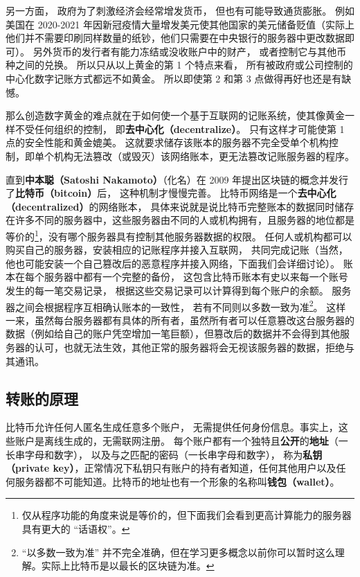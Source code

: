 另一方面， 政府为了刺激经济会经常增发货币， 但也有可能导致通货膨胀。 例如美国在 2020-2021 年因新冠疫情大量增发美元使其他国家的美元储备贬值（实际上他们并不需要印刷同样数量的纸钞，他们只需要在中央银行的服务器中更改数据即可）。 另外货币的发行者有能力冻结或没收账户中的财产， 或者控制它与其他币种之间的兑换。 所以只从以上黄金的第 1 个特点来看， 所有被政府或公司控制的中心化数字记账方式都远不如黄金。 所以即使第 2 和第 3 点做得再好也还是有缺憾。

那么创造数字黄金的难点就在于如何使一个基于互联网的记账系统，使其像黄金一样不受任何组织的控制， 即\textbf{去中心化（decentralize）}。 只有这样才可能使第 1 点的安全性能和黄金媲美。 这就要求储存该账本的服务器不完全受单个机构控制，即单个机构无法篡改（或毁灭）该网络账本，更无法篡改记账服务器的程序。

直到\textbf{中本聪（Satoshi Nakamoto）}（化名）在 2009 年提出区块链的概念并发行了\textbf{比特币（bitcoin）}后， 这种机制才慢慢完善。 比特币网络是一个\textbf{去中心化（decentralized）}的网络账本， 具体来说就是说比特币完整账本的数据同时储存在许多不同的服务器中，这些服务器由不同的人或机构拥有，且服务器的地位都是等价的\footnote{仅从程序功能的角度来说是等价的，但下面我们会看到更高计算能力的服务器具有更大的 “话语权”。}，没有哪个服务器具有控制其他服务器数据的权限。 任何人或机构都可以购买自己的服务器，安装相应的记账程序并接入互联网， 共同完成记账（当然，他也可能安装一个自己篡改后的恶意程序并接入网络，下面我们会详细讨论）。 账本在每个服务器中都有一个完整的备份， 这包含比特币账本有史以来每一个账号发生的每一笔交易记录， 根据这些交易记录可以计算得到每个账户的余额。 服务器之间会根据程序互相确认账本的一致性， 若有不同则以多数一致为准\footnote{“以多数一致为准” 并不完全准确，但在学习更多概念以前你可以暂时这么理解。实际上比特币是以最长的区块链为准。}。 这样一来，虽然每台服务器都有具体的所有者，虽然所有者可以任意篡改这台服务器的数据（例如给自己的账户凭空增加一笔巨额），但篡改后的数据并不会得到其他服务器的认可，也就无法生效，其他正常的服务器将会无视该服务器的数据，拒绝与其通讯。

\subsection{转账的原理}
比特币允许任何人匿名生成任意多个账户， 无需提供任何身份信息。事实上，这些账户是离线生成的，无需联网注册。 每个账户都有一个独特且\textbf{公开}的\textbf{地址}（一长串字母和数字）， 以及与之匹配的密码（一长串字母和数字）， 称为\textbf{私钥（private key）}，正常情况下私钥只有账户的持有者知道，任何其他用户以及任何服务器都不可能知道。比特币的地址也有一个形象的名称叫\textbf{钱包（wallet）}。

